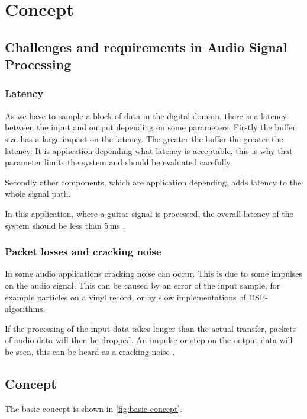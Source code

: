 \section{Concept}

\subsection{Challenges and requirements in Audio Signal Processing}

\subsubsection{Latency}

As we have to sample a block of data in the digital domain, there is a latency between the input and output
depending on some parameters. Firstly the buffer size has a large impact on the latency. The greater the buffer the
greater the latency. It is application depending what latency is acceptable, this is why that parameter
limits the system and should be evaluated carefully.

Secondly other components, which are application depending, adds latency to the whole signal path.

In this application, where a guitar signal is processed, the overall latency of the system should be less
than 5\,ms \cite{beckmann_dsp}.

\subsubsection{Packet losses and cracking noise}

In some audio applications cracking noise can occur. This is due to
some impulses on the audio signal. This can be caused by an error of the input sample, for example particles
on a vinyl record, or by slow implementations of \ac{DSP}-algorithms.

If the processing of the input data takes longer than the actual transfer, packets of audio data will
then be dropped. An impulse or step on the output data will be seen, this can be heard as a cracking noise
\cite{stotz_audio_video}.

\subsection{Concept}

The basic concept is shown in \autoref{fig:basic-concept}.

